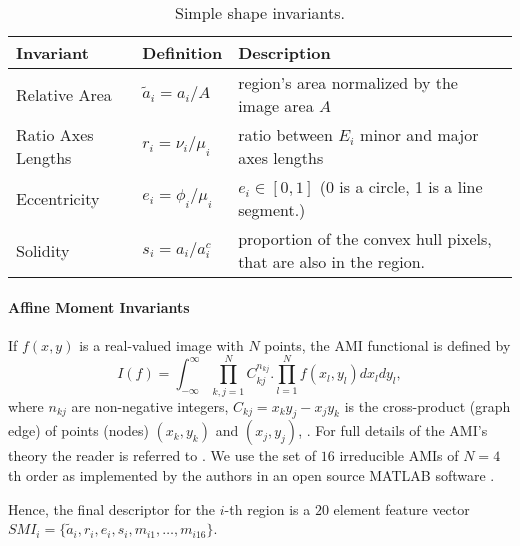 \documentclass[a4paper,11pt]{article}
\begin{document}
\begin{table}[!ht]
\begin{center}
\begin{tabular}{|l||l|l|}
\hline
Invariant & Definition & Description\\
\hline
\hline
Relative Area & $\tilde{a}_i = {a_i}/{A}$ & region's area normalized by the image area $A$\\
\hline
Ratio Axes Lengths & $r_i = {\nu_i}/{\mu_i}$& ratio between $E_i$ minor and major axes lengths\\
\hline
Eccentricity &$e_i = \phi_i/\mu_i$& $e_i \in [0,1]$ (0 is a circle, 1 is a line segment.)\\
\hline
Solidity & $s_i = {a_i}/{a_i^c} $ & proportion of the convex hull pixels, that are also in the region. \\
\hline
\end{tabular}
\end{center}
\vspace{-20pt}
\caption{\small Simple shape invariants.} \label{tab:ssi}
  \vspace{-20pt}
\end{table}

\paragraph{Affine Moment Invariants}
 
If $f(x,y)$ is a real-valued image with $N$ points, the AMI functional is defined by
\begin{equation}
I(f) = \int_{-\infty}^{\infty} \prod_{k,j=1}^{N}C_{kj}^{n_{kj}} . \prod_{l=1}^{N}f(x_l, y_l)dx_ldy_l,
\end{equation}
where $n_{kj}$ are non-negative integers, $C_{kj} =x_ky_j - x_jy_k$ is the cross-product (graph edge) of points (nodes) $(x_k, y_k)$ and $(x_j, y_j)$, \cite{SukF04}. For full details of the AMI's theory the reader is referred to \cite{Flusser09a}.
We use the set of $16$ irreducible AMIs of $N=4$th order as implemented by the authors in an open source MATLAB software \cite{UTIAcode}. 

Hence, the final descriptor for the $i$-th region is a $20$ element feature vector $SMI_i = \{\tilde{a}_i, r_i, e_i, s_i, m_{i1}, \ldots, m_{i16}\}$. 
\end{document}

